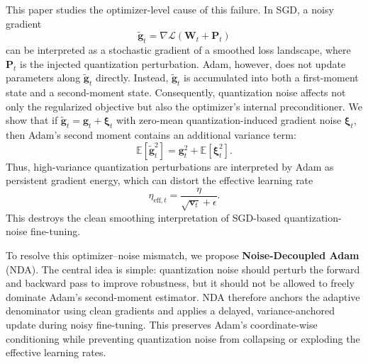 \documentclass[journal]{IEEEtran}
\begin{document}
This paper studies the optimizer-level cause of this failure. In SGD, a noisy gradient
\begin{equation}
    \tilde{\boldsymbol{g}}_t
    =
    \nabla \mathcal{L}(\boldsymbol{W}_t+\boldsymbol{P}_t)
\end{equation}
can be interpreted as a stochastic gradient of a smoothed loss landscape, where $\boldsymbol{P}_t$ is the injected quantization perturbation. Adam, however, does not update parameters along $\tilde{\boldsymbol{g}}_t$ directly. Instead, $\tilde{\boldsymbol{g}}_t$ is accumulated into both a first-moment state and a second-moment state. Consequently, quantization noise affects not only the regularized objective but also the optimizer's internal preconditioner. We show that if $\tilde{\boldsymbol{g}}_t=\boldsymbol{g}_t+\boldsymbol{\xi}_t$ with zero-mean quantization-induced gradient noise $\boldsymbol{\xi}_t$, then Adam's second moment contains an additional variance term:
\begin{equation}
    \mathbb{E}[\tilde{\boldsymbol{g}}_t^2]
    =
    \boldsymbol{g}_t^2
    +
    \mathbb{E}[\boldsymbol{\xi}_t^2].
\end{equation}
Thus, high-variance quantization perturbations are interpreted by Adam as persistent gradient energy, which can distort the effective learning rate
\begin{equation}
    \eta_{\mathrm{eff},t}
    =
    \frac{\eta}{\sqrt{\boldsymbol{v}_t}+\epsilon}.
\end{equation}
This destroys the clean smoothing interpretation of SGD-based quantization-noise fine-tuning.

To resolve this optimizer--noise mismatch, we propose \textbf{Noise-Decoupled Adam} (NDA). The central idea is simple: quantization noise should perturb the forward and backward pass to improve robustness, but it should not be allowed to freely dominate Adam's second-moment estimator. NDA therefore anchors the adaptive denominator using clean gradients and applies a delayed, variance-anchored update during noisy fine-tuning. This preserves Adam's coordinate-wise conditioning while preventing quantization noise from collapsing or exploding the effective learning rates.
\end{document}

